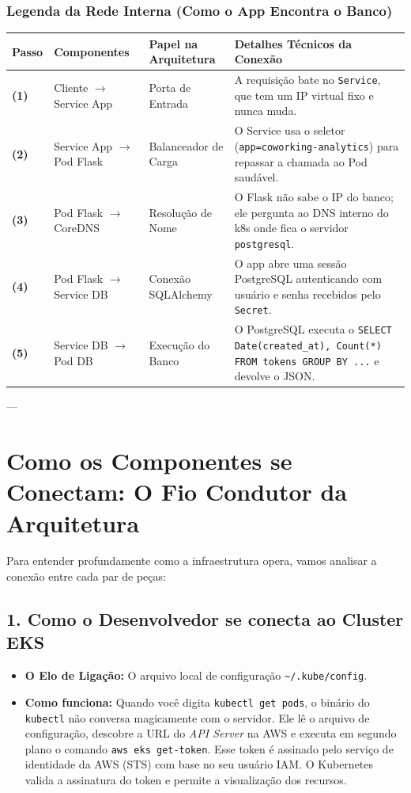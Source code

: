 \documentclass[11pt,a4paper]{article}
\begin{document}
\vspace{0.2cm}

\subsubsection*{Legenda da Rede Interna (Como o App Encontra o Banco)}
\begin{center}
\small
\begin{tabular}{p{0.8cm} p{3.2cm} p{4.2cm} p{7.0cm}}
\toprule
\textbf{Passo} & \textbf{Componentes} & \textbf{Papel na Arquitetura} & \textbf{Detalhes Técnicos da Conexão} \\
\midrule
\textbf{(1)} & Cliente $\rightarrow$ Service App & Porta de Entrada & A requisição bate no \texttt{Service}, que tem um IP virtual fixo e nunca muda. \\
\textbf{(2)} & Service App $\rightarrow$ Pod Flask & Balanceador de Carga & O Service usa o seletor (\texttt{app=coworking-analytics}) para repassar a chamada ao Pod saudável. \\
\textbf{(3)} & Pod Flask $\rightarrow$ CoreDNS & Resolução de Nome & O Flask não sabe o IP do banco; ele pergunta ao DNS interno do k8s onde fica o servidor \texttt{postgresql}. \\
\textbf{(4)} & Pod Flask $\rightarrow$ Service DB & Conexão SQLAlchemy & O app abre uma sessão PostgreSQL autenticando com usuário e senha recebidos pelo \texttt{Secret}. \\
\textbf{(5)} & Service DB $\rightarrow$ Pod DB & Execução do Banco & O PostgreSQL executa o \texttt{SELECT Date(created\_at), Count(*) FROM tokens GROUP BY ...} e devolve o JSON. \\
\bottomrule
\end{tabular}
\end{center}

---

\section{Como os Componentes se Conectam: O Fio Condutor da Arquitetura}

Para entender profundamente como a infraestrutura opera, vamos analisar a conexão entre cada par de peças:

\subsection{1. Como o Desenvolvedor se conecta ao Cluster EKS}
\begin{itemize}[leftmargin=*]
    \item \textbf{O Elo de Ligação:} O arquivo local de configuração \texttt{\textasciitilde/.kube/config}.
    \item \textbf{Como funciona:} Quando você digita \texttt{kubectl get pods}, o binário do \texttt{kubectl} não conversa magicamente com o servidor. Ele lê o arquivo de configuração, descobre a URL do \textit{API Server} na AWS e executa em segundo plano o comando \texttt{aws eks get-token}. Esse token é assinado pelo serviço de identidade da AWS (STS) com base no seu usuário IAM. O Kubernetes valida a assinatura do token e permite a visualização dos recursos.
\end{itemize}
\end{document}
